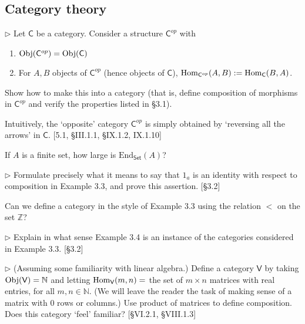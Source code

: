 \subsection{Category theory}


\begin{problem}
  $\rhd$ Let $\mathsf{C}$ be a category. Consider a structure
  $\mathsf{C}^{op}$ with
  \begin{enumerate}
    \item $\mathrm{Obj}(\mathsf{C}^{op}) = \mathrm{Obj}(\mathsf{C})$
    \item For $A, B$ objects of $\mathsf{C}^{op}$ (hence objects of
    $\mathsf{C}$), $\mathrm{Hom}_{\mathsf{C}^{op}}(A, B) := \mathrm{Hom}_{\mathsf{C}}(B, A)$.
  \end{enumerate}
  Show how to make this into a category (that is, define composition of
  morphisms in $\mathsf{C}^{op}$ and verify the properties listed in \S3.1).

  Intuitively, the `opposite' category $\mathsf{C}^{op}$ is simply obtained
  by `reversing all the arrows' in $\mathsf{C}$. [5.1, \S III.1.1, \S IX.1.2,
  IX.1.10]
\end{problem}

\begin{problem}
  If $A$ is a finite set, how large is $\mathrm{End}_{\mathsf{Set}}(A)$?
\end{problem}

\begin{problem}
  $\rhd$ Formulate precisely what it means to say that $1_a$ is an identity
  with respect to composition in Example 3.3, and prove this assertion.
  [\S3.2]
\end{problem}

\begin{problem}
  Can we define a category in the style of Example 3.3 using the relation
  $<$ on the set $\mathbb{Z}$?
\end{problem}

\begin{problem}
  $\rhd$ Explain in what sense Example 3.4 is an instance of the categories
  considered in Example 3.3. [\S 3.2]
\end{problem}

\begin{problem}
  $\rhd$ (Assuming some familiarity with linear algebra.) Define a category
  $\mathsf{V}$ by taking $\mathrm{Obj}(\mathsf{V}) = \mathbb{N}$ and letting
  $\mathrm{Hom}_{\mathsf{V}}(m,n) = $ the set of $m\times n$ matrices with real
  entries, for all $m,n\in\mathbb{N}$. (We will leave the reader the task of
  making sense of a matrix with 0 rows or columns.) Use product of matrices
  to define composition. Does this category `feel' familiar?
  [\S VI.2.1, \S VIII.1.3]
\end{problem}

